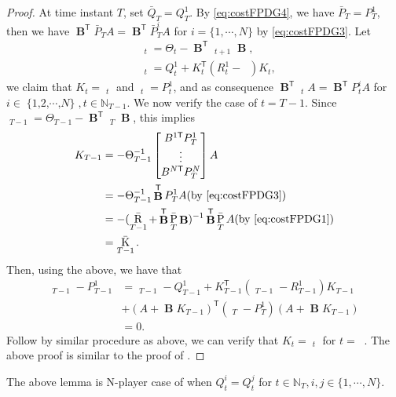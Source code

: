 \documentclass[letterpaper, 10 pt, conference]{ieeeconf}  %
\newcommand{\transpose}{\mathsf{T}}
\DeclareMathOperator{\contB}{\mathbf{B}}
\DeclareMathOperator{\Nplayers}{\{1,2,\cdots,\textit{N}\}}
\DeclareMathOperator{\Rgame}{\bar{R}}
\DeclareMathOperator{\Qgame}{\bar{Q}}
\DeclareMathOperator{\Pgame}{\bar{P}}
\DeclareMathOperator{\Kgame}{\bar{K}}
\DeclareMathOperator{\Timelen}{\mathbb{N}_{T-1}}
\newcommand{\RBPGame}[1]{\Rgame_{#1 -1}+\contB^{\transpose}\Pgame_{#1}\contB}
\begin{document}
\begin{proof}
    At time instant $T$, set $\bar{Q}_{T} = Q_{T}^{1}$. By \eqref{eq:costFPDG4}, we have $\bar{P}_{T} = P_{T}^{1}$, then we have $\contB^{\transpose}\bar{P}_{T}A = \contB^{\transpose}\bar{P}_{T}^{i}A$ for $i = \{1,\cdots,N\}$ by \eqref{eq:costFPDG3}.
    Let 
    \begin{align*}
        &\Rgame_{t} = \Theta_{t} - \contB^{\transpose}\Pgame_{t+1}\contB,\\
        &\Qgame_{t} = Q_{t}^{1} + K_{t}^{\transpose}(R_{t}^{1} - \Rgame)K_{t},
    \end{align*}
    we claim that $K_{t} = \Kgame_{t}$ and $\Pgame_{t} = P_{t}^{1}$, and as consequence $\contB^{\transpose}\Pgame_{t}A = \contB^{\transpose} P_{t}^{i}A$ for $i \in \Nplayers, t\in \mathbb{N}_{T-1}$. 
    We now verify the case of $t = T-1$. Since $\Rgame_{T-1} = \Theta_{T-1} - \contB^{\transpose}\Pgame_{T}\contB$, this implies
    \begin{align*}
        K_{T-1} &= -\Theta_{T-1}^{-1}
        \begin{bmatrix}
            B^{1\transpose}P_{T}^{1}\\
            \vdots\\
            B^{N\transpose}P_{T}^{N}
        \end{bmatrix}A\\
        &= -\Theta_{T-1}^{-1}\contB^{\transpose}P_{T}^{1}A\text{(by \eqref{eq:costFPDG3})}\\
        &= -(\RBPGame{T})^{-1}\contB^{\transpose}\Pgame_{T}A\text{(by \eqref{eq:costFPDG1})}\\
        &= \Kgame_{T-1}.
    \end{align*}
    Then, using the above, we have that
    \begin{align*}
        \Pgame_{T-1} - P_{T-1}^{1} &= \Qgame_{T-1}-Q_{T-1}^{1} + K_{T-1}^{\transpose}(\Rgame_{T-1}-R_{T-1}^{1})K_{T-1} \\
        &+ (A+\contB K_{T-1})^{\transpose}(\Pgame_{T}-P_{T}^{1})(A+\contB K_{T-1})\\
        &= 0.
    \end{align*}
    Follow by similar procedure as above, we can verify that 
    $K_{t} = \Kgame_{t}$ for $t = \Timelen$. The above proof is similar to the proof of \cite[Theorem 6]{prasad_structure_2023}.
\end{proof}
The above lemma is N-player case of \cite[Theorem 6]{prasad_structure_2023} when $Q_{t}^{i}=Q_{t}^{j}$ for $t\in \mathbb{N}_T, i,j \in \{1,\cdots,N\}$.
\end{document}

